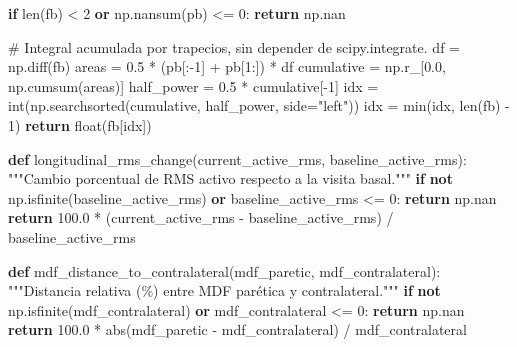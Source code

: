 \documentclass[
  spanish,
  a4paper,
  DIV=11,
  numbers=noendperiod]{scrreprt}
\newenvironment{Shaded}{\begin{snugshade}}{\end{snugshade}}
\newcommand{\BuiltInTok}[1]{\textcolor[rgb]{0.00,0.23,0.31}{#1}}
\newcommand{\CommentTok}[1]{\textcolor[rgb]{0.37,0.37,0.37}{#1}}
\newcommand{\ControlFlowTok}[1]{\textcolor[rgb]{0.00,0.23,0.31}{\textbf{#1}}}
\newcommand{\DecValTok}[1]{\textcolor[rgb]{0.68,0.00,0.00}{#1}}
\newcommand{\FloatTok}[1]{\textcolor[rgb]{0.68,0.00,0.00}{#1}}
\newcommand{\KeywordTok}[1]{\textcolor[rgb]{0.00,0.23,0.31}{\textbf{#1}}}
\newcommand{\NormalTok}[1]{\textcolor[rgb]{0.00,0.23,0.31}{#1}}
\newcommand{\OperatorTok}[1]{\textcolor[rgb]{0.37,0.37,0.37}{#1}}
\newcommand{\StringTok}[1]{\textcolor[rgb]{0.13,0.47,0.30}{#1}}
\begin{document}
\begin{Shaded}
\begin{Highlighting}[]
    \ControlFlowTok{if} \BuiltInTok{len}\NormalTok{(fb) }\OperatorTok{\textless{}} \DecValTok{2} \KeywordTok{or}\NormalTok{ np.nansum(pb) }\OperatorTok{\textless{}=} \DecValTok{0}\NormalTok{:}
        \ControlFlowTok{return}\NormalTok{ np.nan}

    \CommentTok{\# Integral acumulada por trapecios, sin depender de scipy.integrate.}
\NormalTok{    df }\OperatorTok{=}\NormalTok{ np.diff(fb)}
\NormalTok{    areas }\OperatorTok{=} \FloatTok{0.5} \OperatorTok{*}\NormalTok{ (pb[:}\OperatorTok{{-}}\DecValTok{1}\NormalTok{] }\OperatorTok{+}\NormalTok{ pb[}\DecValTok{1}\NormalTok{:]) }\OperatorTok{*}\NormalTok{ df}
\NormalTok{    cumulative }\OperatorTok{=}\NormalTok{ np.r\_[}\FloatTok{0.0}\NormalTok{, np.cumsum(areas)]}
\NormalTok{    half\_power }\OperatorTok{=} \FloatTok{0.5} \OperatorTok{*}\NormalTok{ cumulative[}\OperatorTok{{-}}\DecValTok{1}\NormalTok{]}
\NormalTok{    idx }\OperatorTok{=} \BuiltInTok{int}\NormalTok{(np.searchsorted(cumulative, half\_power, side}\OperatorTok{=}\StringTok{"left"}\NormalTok{))}
\NormalTok{    idx }\OperatorTok{=} \BuiltInTok{min}\NormalTok{(idx, }\BuiltInTok{len}\NormalTok{(fb) }\OperatorTok{{-}} \DecValTok{1}\NormalTok{)}
    \ControlFlowTok{return} \BuiltInTok{float}\NormalTok{(fb[idx])}


\KeywordTok{def}\NormalTok{ longitudinal\_rms\_change(current\_active\_rms, baseline\_active\_rms):}
    \CommentTok{"""Cambio porcentual de RMS activo respecto a la visita basal."""}
    \ControlFlowTok{if} \KeywordTok{not}\NormalTok{ np.isfinite(baseline\_active\_rms) }\KeywordTok{or}\NormalTok{ baseline\_active\_rms }\OperatorTok{\textless{}=} \DecValTok{0}\NormalTok{:}
        \ControlFlowTok{return}\NormalTok{ np.nan}
    \ControlFlowTok{return} \FloatTok{100.0} \OperatorTok{*}\NormalTok{ (current\_active\_rms }\OperatorTok{{-}}\NormalTok{ baseline\_active\_rms) }\OperatorTok{/}\NormalTok{ baseline\_active\_rms}


\KeywordTok{def}\NormalTok{ mdf\_distance\_to\_contralateral(mdf\_paretic, mdf\_contralateral):}
    \CommentTok{"""Distancia relativa (\%) entre MDF parética y contralateral."""}
    \ControlFlowTok{if} \KeywordTok{not}\NormalTok{ np.isfinite(mdf\_contralateral) }\KeywordTok{or}\NormalTok{ mdf\_contralateral }\OperatorTok{\textless{}=} \DecValTok{0}\NormalTok{:}
        \ControlFlowTok{return}\NormalTok{ np.nan}
    \ControlFlowTok{return} \FloatTok{100.0} \OperatorTok{*} \BuiltInTok{abs}\NormalTok{(mdf\_paretic }\OperatorTok{{-}}\NormalTok{ mdf\_contralateral) }\OperatorTok{/}\NormalTok{ mdf\_contralateral}



\end{Highlighting}
\end{Shaded}
\end{document}
